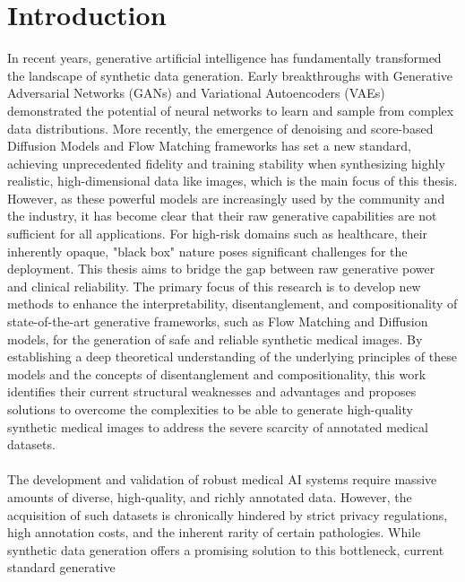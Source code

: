 \chapter{Introduction}\label{ch:introduction}

In recent years, generative artificial intelligence has fundamentally transformed the landscape of synthetic data generation. 
Early breakthroughs with Generative Adversarial Networks (GANs) and Variational Autoencoders (VAEs) demonstrated the potential 
of neural networks to learn and sample from complex data distributions. More recently, the emergence of denoising and score-based Diffusion Models 
and Flow Matching frameworks has set a new standard, achieving unprecedented fidelity and training stability when synthesizing 
highly realistic, high-dimensional data like images, which is the main focus of this thesis. \\
However, as these powerful models are increasingly used by the community and the industry, it has become clear that their raw 
generative capabilities are not sufficient for all applications. For high-risk domains such as healthcare, their inherently opaque, 
"black box" nature poses significant challenges for the deployment. This thesis aims to bridge the gap between raw generative power and clinical reliability. The primary focus of 
this research is to develop new methods to enhance the interpretability, disentanglement, and compositionality of state-of-the-art generative frameworks, such as 
Flow Matching and Diffusion models, for the generation of safe and reliable synthetic medical images. By establishing a deep theoretical 
understanding of the underlying principles of these models and the concepts of disentanglement and compositionality, this work identifies their current structural weaknesses and advantages and proposes 
solutions to overcome the complexities to be able to generate high-quality synthetic medical images to address the severe scarcity of annotated medical datasets. \\
\\
The development and validation of robust medical AI systems require massive amounts of diverse, high-quality, and richly annotated data.
However, the acquisition of such datasets is chronically hindered by strict privacy regulations, high annotation costs, and the inherent 
rarity of certain pathologies. While synthetic data generation offers a promising solution to this bottleneck, current standard generative 
